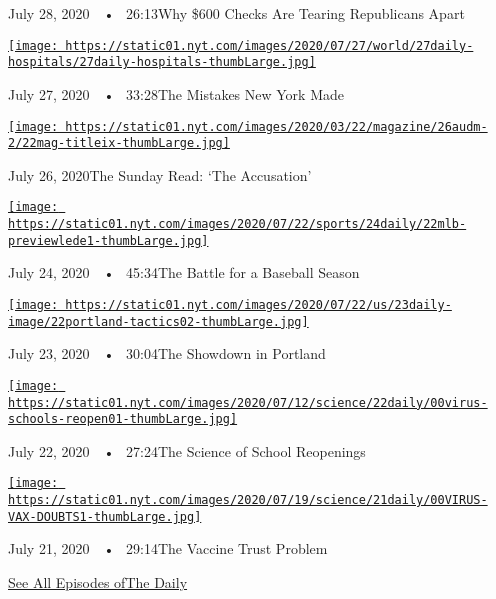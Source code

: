 July 28, 2020~~•~ 26:13Why \$600 Checks Are Tearing Republicans Apart

\href{https://www.nytimes.com/2020/07/27/podcasts/the-daily/new-york-hospitals-covid.html?action=click\&module=audio-series-bar\&region=header\&pgtype=Article}{\texttt{[image: https://static01.nyt.com/images/2020/07/27/world/27daily-hospitals/27daily-hospitals-thumbLarge.jpg]}}

July 27, 2020~~•~ 33:28The Mistakes New York Made

\href{https://www.nytimes.com/2020/07/26/podcasts/the-daily/the-accusation-the-sunday-read.html?action=click\&module=audio-series-bar\&region=header\&pgtype=Article}{\texttt{[image: https://static01.nyt.com/images/2020/03/22/magazine/26audm-2/22mag-titleix-thumbLarge.jpg]}}

July 26, 2020The Sunday Read: `The Accusation'

\href{https://www.nytimes.com/2020/07/24/podcasts/the-daily/mlb-baseball-season-coronavirus.html?action=click\&module=audio-series-bar\&region=header\&pgtype=Article}{\texttt{[image: https://static01.nyt.com/images/2020/07/22/sports/24daily/22mlb-previewlede1-thumbLarge.jpg]}}

July 24, 2020~~•~ 45:34The Battle for a Baseball Season

\href{https://www.nytimes.com/2020/07/23/podcasts/the-daily/portland-protests.html?action=click\&module=audio-series-bar\&region=header\&pgtype=Article}{\texttt{[image: https://static01.nyt.com/images/2020/07/22/us/23daily-image/22portland-tactics02-thumbLarge.jpg]}}

July 23, 2020~~•~ 30:04The Showdown in Portland

\href{https://www.nytimes.com/2020/07/22/podcasts/the-daily/school-reopenings-coronavirus.html?action=click\&module=audio-series-bar\&region=header\&pgtype=Article}{\texttt{[image: https://static01.nyt.com/images/2020/07/12/science/22daily/00virus-schools-reopen01-thumbLarge.jpg]}}

July 22, 2020~~•~ 27:24The Science of School Reopenings

\href{https://www.nytimes.com/2020/07/21/podcasts/the-daily/coronavirus-vaccine.html?action=click\&module=audio-series-bar\&region=header\&pgtype=Article}{\texttt{[image: https://static01.nyt.com/images/2020/07/19/science/21daily/00VIRUS-VAX-DOUBTS1-thumbLarge.jpg]}}

July 21, 2020~~•~ 29:14The Vaccine Trust Problem

\href{https://www.nytimes.com/column/the-daily}{See All Episodes ofThe
Daily}

